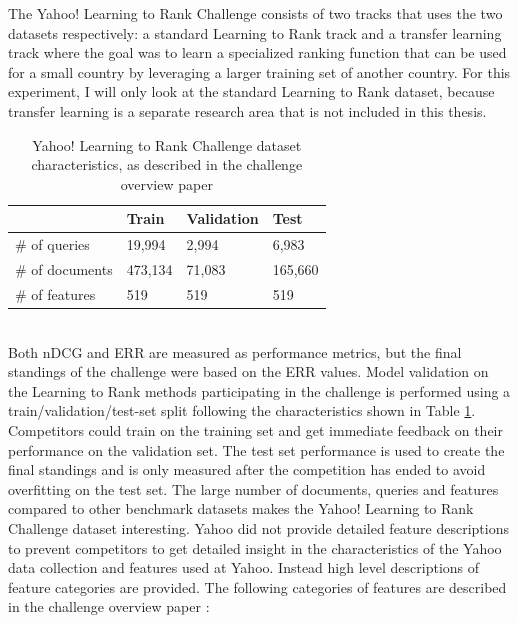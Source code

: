 The Yahoo! Learning to Rank Challenge consists of two tracks that uses the two datasets respectively: a standard Learning to Rank track and a transfer learning track where the goal was to learn a specialized ranking function that can be used for a small country by leveraging a larger training set of another country. For this experiment, I will only look at the standard Learning to Rank dataset, because transfer learning is a separate research area that is not included in this thesis.\\
\begin{table}[!h]
\begin{tabular}{l|lll}
 & Train & Validation & Test \\ 
 \hline
\# of queries & 19,994 & 2,994 & 6,983 \\ 
\# of documents & 473,134 & 71,083 & 165,660 \\ 
\# of features & 519 & 519 & 519 \\ 
\end{tabular}
\caption{Yahoo! Learning to Rank Challenge dataset characteristics, as described in the challenge overview paper \cite{Chapelle2011a}}
\label{tab:yahoo_characteristics}
\end{table}\\
Both \ac{nDCG} and \ac{ERR} are measured as performance metrics, but the final standings of the challenge were based on the \ac{ERR} values. Model validation on the Learning to Rank methods participating in the challenge is performed using a train/validation/test-set split following the characteristics shown in Table \ref{tab:yahoo_characteristics}. Competitors could train on the training set and get immediate feedback on their performance on the validation set. The test set performance is used to create the final standings and is only measured after the competition has ended to avoid overfitting on the test set. The large number of documents, queries and features compared to other benchmark datasets makes the Yahoo! Learning to Rank Challenge dataset interesting. Yahoo did not provide detailed feature descriptions to prevent competitors to get detailed insight in the characteristics of the Yahoo data collection and features used at Yahoo. Instead high level descriptions of feature categories are provided. The following categories of features are described in the challenge overview paper \cite{Chapelle2011a}:\\
